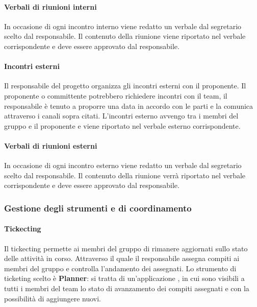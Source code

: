 \paragraph{Verbali di riunioni interni} 
In occasione di ogni incontro interno viene redatto un verbale dal segretario scelto dal responsabile. Il contenuto della riunione viene riportato nel verbale corrispondente e deve essere approvato dal responsabile.
\newline \newline

\paragraph{Incontri esterni} 
Il responsabile del progetto organizza gli incontri esterni con il proponente. Il proponente o committente potrebbero richiedere incontri con il team, il responsabile è tenuto a proporre una data in accordo con le parti e la comunica attraverso i canali sopra citati.
L'incontri esterno avvengo tra i membri del gruppo e il proponente e viene riportato nel verbale esterno corrispondente.
 \newline \newline

\paragraph{Verbali di riunioni esterni} 
In occasione di ogni incontro esterno viene redatto un verbale dal segretario scelto dal responsabile. Il contenuto della riunione verrà riportato nel verbale corrispondente e deve essere approvato dal responsabile.
\newline \newline
\subsubsection{Gestione degli strumenti e di coordinamento}
\paragraph{Tickecting}

Il tickecting permette ai  membri del gruppo di rimanere aggiornati sullo stato delle attività in corso. Attraverso il quale il responsabile assegna compiti ai membri del gruppo e controlla l'andamento dei  assegnati. Lo strumento di ticketing scelto è \textbf{Planner}: si tratta di un'applicazione , in cui sono visibili a tutti i membri del team lo stato di avanzamento dei compiti assegnati e con la possibilità di aggiungere nuovi. 
\newline \newline
